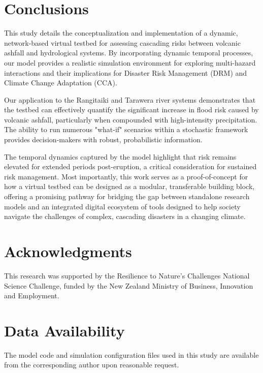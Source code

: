 \documentclass[12pt, a4paper]{article}
\begin{document}
\section{Conclusions}
This study details the conceptualization and implementation of a dynamic, network-based virtual testbed for assessing cascading risks between volcanic ashfall and hydrological systems. By incorporating dynamic temporal processes, our model provides a realistic simulation environment for exploring multi-hazard interactions and their implications for Disaster Risk Management (DRM) and Climate Change Adaptation (CCA).

Our application to the Rangitaiki and Tarawera river systems demonstrates that the testbed can effectively quantify the significant increase in flood risk caused by volcanic ashfall, particularly when compounded with high-intensity precipitation. The ability to run numerous "what-if" scenarios within a stochastic framework provides decision-makers with robust, probabilistic information.

The temporal dynamics captured by the model highlight that risk remains elevated for extended periods post-eruption, a critical consideration for sustained risk management. Most importantly, this work serves as a proof-of-concept for how a virtual testbed can be designed as a modular, transferable building block, offering a promising pathway for bridging the gap between standalone research models and an integrated digital ecosystem of tools designed to help society navigate the challenges of complex, cascading disasters in a changing climate.

\section*{Acknowledgments}
This research was supported by the Resilience to Nature’s Challenges National Science Challenge, funded by the New Zealand Ministry of Business, Innovation and Employment.

\section*{Data Availability}
The model code and simulation configuration files used in this study are available from the corresponding author upon reasonable request.
\end{document}

